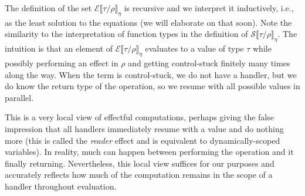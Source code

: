 \documentclass[a4paper, 11pt,titlepage, openright, twoside]{report}
\newcommand{\E}{\mathcal{E}}
\renewcommand{\S}{\mathcal{S}}
\newcommand{\+}{\enspace}
\begin{document}
The definition of the set $\E⟦τ/ρ⟧_η$ is recursive and we interpret it inductively,
i.e., as the least solution to the equations (we will elaborate on that soon).
Note the similarity to the interpretation of function types in the definition of
$\S⟦τ/ρ⟧_η$.
The intuition is that an element of $\E⟦τ/ρ⟧_η$
evaluates to a value of type $τ$ while possibly performing an effect in $ρ$ and
getting control-stuck
finitely many times along the way.
When the term is control-stuck, we do not have a handler,
but we do know the return type of the operation,
so we resume with all possible values in parallel.

This is a very local view of effectful computations,
perhaps giving the false impression that all handlers immediately resume with a value and
do nothing more (this is called the {\em reader} effect and is equivalent to dynamically-scoped variables).
In reality, much can happen between
performing the operation and it finally returning.
Nevertheless, this local view suffices for our purposes and
accurately reflects how much of the computation remains in the scope of a handler
throughout evaluation.
\end{document}

